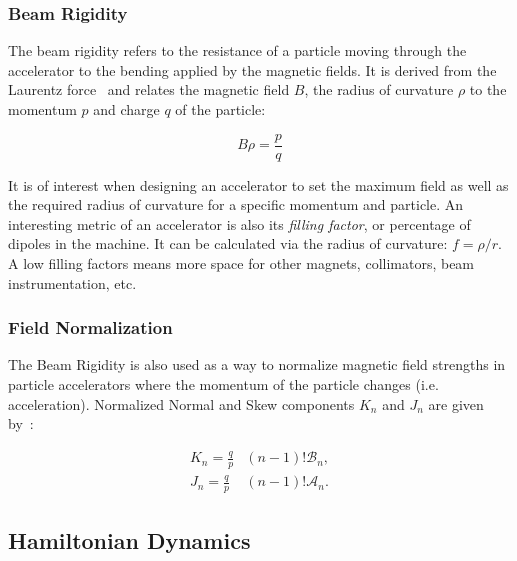 \subsubsection{Beam Rigidity}

The beam rigidity refers to the resistance of a particle moving through the accelerator to the
bending applied by the magnetic fields. It is derived from the Laurentz force~\cite{dilly_corrections_2022}
and relates the magnetic field $B$, the radius of curvature $\rho$ to the momentum $p$ and charge $q$
of the particle:

\begin{equation}
    B \rho = \frac{p}{q}
    \label{eq:magnetic_fields_beam_rigidity}
\end{equation}

It is of interest when designing an accelerator to set the maximum field as well as the required
radius of curvature for a specific momentum and particle.
An interesting metric of an accelerator is also its \textit{filling factor}, or percentage of
dipoles in the machine. It can be calculated via the radius of curvature: $f = \rho / r$. A low 
filling factors means more space for other magnets, collimators, beam instrumentation, etc.

\subsubsection{Field Normalization}

The Beam Rigidity is also used as a way to normalize magnetic field strengths in particle
accelerators where the momentum of the particle changes (i.e. acceleration).
Normalized Normal and Skew components $K_n$ and $J_n$ are given by~\cite{wolf_engineering_2001}:

\begin{equation}
    \begin{aligned}
        K_n =  \frac{q}{p} &(n-1)! \mathcal{B}_n, \\ 
        J_n =  \frac{q}{p} &(n-1)! \mathcal{A}_n.
    \end{aligned}
    \label{eq:magnetic_fields_normalized}
\end{equation}



\subsection{Hamiltonian Dynamics}

